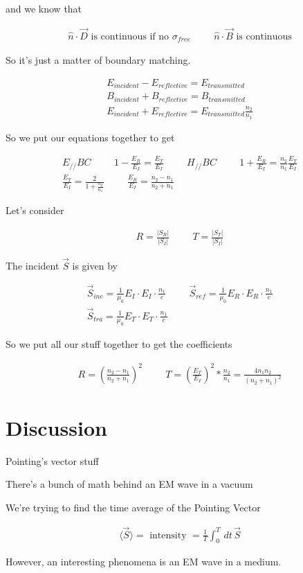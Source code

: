 \documentclass[fleqn]{report}
\newcommand{\hp}{\hspace{1cm}}
\newcommand{\equations} [1] {
\begin{gather*}
#1
\end{gather*}
}
\begin{document}
and we know that 
\equations{
    \hat n \cdot \vec D 
    \textrm{ is continuous if no $\sigma_{free}$}
    \hp 
    \hat n \cdot \vec B
    \textrm{ is continuous}
}

So it's just a matter of boundary matching. 

\equations{
    E_{incident}
    -
    E_{reflective}
    =
    E_{transmitted}
    \\
    B_{incident}
    +
    B_{reflective}
    =
    B_{transmitted}
    \\
    E_{incident}
    +
    E_{reflective}
    =
    E_{transmitted}
    \frac{n_2}{n_1}
}

So we put our equations together to get 
\equations{
    E_{//} BC \hp 1 - \frac{E_R}{E_I} = \frac{E_T}{E_I}
    \hp
    H_{//} BC \hp 
    1 + \frac{E_R}{E_I} = \frac{n_2}{n_1} \frac{E_T}{E_I}
    \\
    \frac{E_T}{E_I}
    =
    \frac{2}{1 + \frac{n_2}{n_1}}
    \hp 
    \frac{E_R}{E_I}
    = 
    \frac{n_2 - n_1}{n_2 + n_1}
}

Let's consider 
\equations{
    R = \frac{|S_R|}{|S_I|}
    \hp
    T = \frac{|S_T|}{|S_I|}
}

The incident $\vec S$ is given by 
\equations{
    \vec S_{inc}
    =
    \frac{1}{\mu_0}
    E_I 
    \cdot 
    E_I \cdot \frac{n_1}{c}
    \hp 
    \vec S_{ref}
    =
    \frac{1}{\mu_0}
    E_R 
    \cdot 
    E_R \cdot \frac{n_1}{c}
    \\
    \vec S_{tra}
    =
    \frac{1}{\mu_0}
    E_T 
    \cdot 
    E_T 
    \cdot 
    \frac{n_1}{c}
}

So we put all our stuff together to get the coefficients
\equations{
    R 
    =
    \left(
        \frac{n_2 - n_1}{n_2 + n_1}
    \right)^2
    \hp 
    T 
    =
    \left(
        \frac{E_T}{E_I}
    \right)^2
    *
    \frac{n_2}{n_1}
    =
    \frac{4 n_1 n_2}{(n_2 + n_1)^2}
}

\section{Discussion}
Pointing's vector stuff 

There's a bunch of math behind an EM wave in a vacuum 

We're trying to find the time average of the Pointing Vector 
\equations{
    \langle \vec S \rangle 
    =
    \textrm{ intensity }
    =
    \frac{1}{T}
    \int^T_0 \, dt \, 
    \vec S 
}

However, an interesting phenomena is an EM wave in a medium. 
\end{document}
